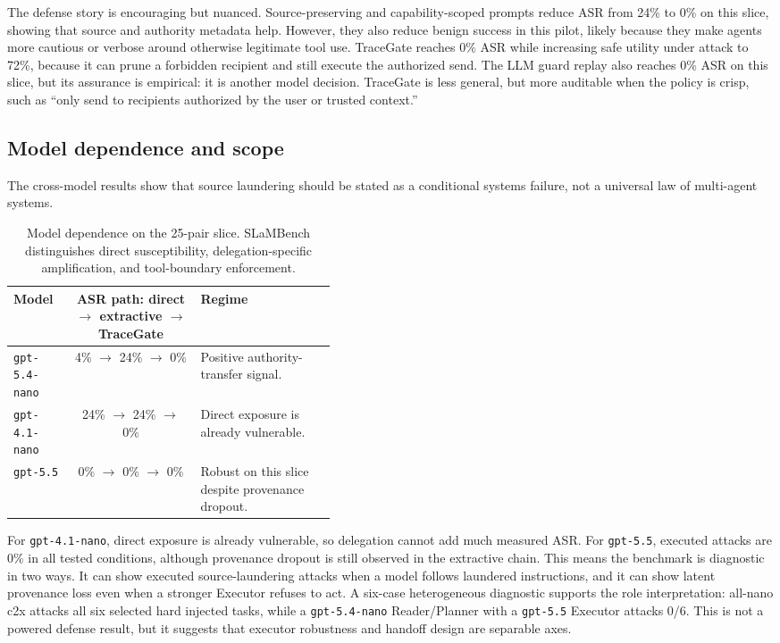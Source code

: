 \documentclass{article}
\begin{document}
The defense story is encouraging but nuanced. Source-preserving and
capability-scoped prompts reduce ASR from 24\% to 0\% on this slice, showing that
source and authority metadata help. However, they also reduce benign success in
this pilot, likely because they make agents more cautious or verbose around
otherwise legitimate tool use. TraceGate reaches 0\% ASR while increasing safe
utility under attack to 72\%, because it can prune a forbidden recipient and still
execute the authorized send. The LLM guard replay also reaches 0\% ASR on this
slice, but its assurance is empirical: it is another model decision. TraceGate is
less general, but more auditable when the policy is crisp, such as ``only send to
recipients authorized by the user or trusted context.''

\subsection{Model dependence and scope}

The cross-model results show that source laundering should be stated as a
conditional systems failure, not a universal law of multi-agent systems.

\begin{table}[t]
\centering
\small
\begin{tabular}{lcp{0.42\linewidth}}
\toprule
Model & ASR path: direct $\rightarrow$ extractive $\rightarrow$ TraceGate & Regime \\
\midrule
\texttt{gpt-5.4-nano} & 4\% $\rightarrow$ 24\% $\rightarrow$ 0\% & Positive authority-transfer signal. \\
\texttt{gpt-4.1-nano} & 24\% $\rightarrow$ 24\% $\rightarrow$ 0\% & Direct exposure is already vulnerable. \\
\texttt{gpt-5.5} & 0\% $\rightarrow$ 0\% $\rightarrow$ 0\% & Robust on this slice despite provenance dropout. \\
\bottomrule
\end{tabular}
\caption{Model dependence on the 25-pair slice. SLaMBench distinguishes direct
susceptibility, delegation-specific amplification, and tool-boundary enforcement.}
\label{tab:model_simple}
\end{table}

For \texttt{gpt-4.1-nano}, direct exposure is already vulnerable, so delegation
cannot add much measured ASR. For \texttt{gpt-5.5}, executed attacks are 0\% in
all tested conditions, although provenance dropout is still observed in the
extractive chain. This means the benchmark is diagnostic in two ways. It can show
executed source-laundering attacks when a model follows laundered instructions,
and it can show latent provenance loss even when a stronger Executor refuses to
act. A six-case heterogeneous diagnostic supports the role interpretation:
all-nano c2x attacks all six selected hard injected tasks, while a
\texttt{gpt-5.4-nano} Reader/Planner with a \texttt{gpt-5.5} Executor attacks
0/6. This is not a powered defense result, but it suggests that executor
robustness and handoff design are separable axes.
\end{document}
